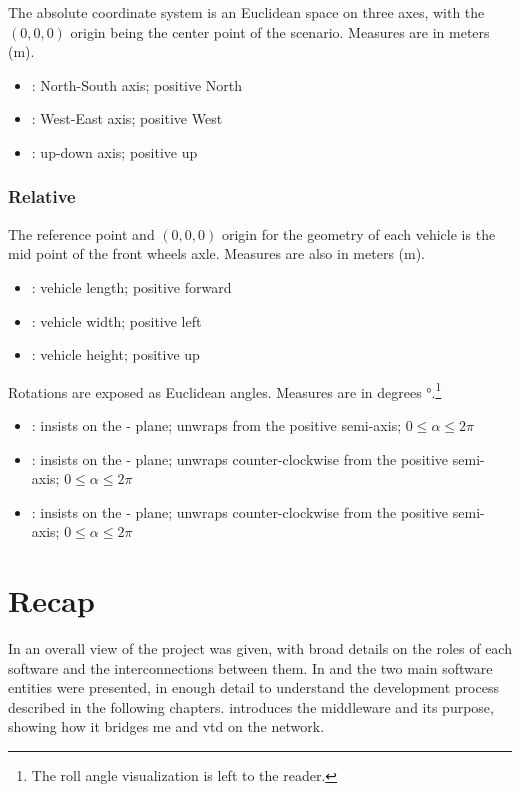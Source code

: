 The absolute coordinate system is an Euclidean space on three axes, with the $(0,0,0)$ origin being the center point of the scenario. Measures are in meters (\si{\meter}).

\begin{itemize}
	\item {}: North-South axis; positive North
	\item {}: West-East axis; positive West
	\item {}: up-down axis; positive up
\end{itemize}

\subsubsection{Relative}

The reference point and $(0,0,0)$ origin for the geometry of each vehicle is the mid point of the front wheels axle. Measures are also in meters (\si{\meter}).

\begin{itemize}
	\item {}: vehicle length; positive forward
	\item {}: vehicle width; positive left
	\item {}: vehicle height; positive up
\end{itemize}

Rotations are exposed as Euclidean angles. Measures are in degrees \si{\degree}.\footnote{The roll angle visualization is left to the reader.}

\begin{itemize}
	\item {}: insists on the - plane; unwraps from the positive  semi-axis; $0 \leqslant \alpha \leqslant 2\pi$
	\item {}: insists on the - plane; unwraps counter-clockwise from the positive  semi-axis; $0 \leqslant \alpha \leqslant 2\pi$
	\item {}: insists on the - plane; unwraps counter-clockwise from the positive  semi-axis; $0 \leqslant \alpha \leqslant 2\pi$
\end{itemize}

\section{Recap}\label{sc:software:recap}

In  an overall view of the project was given, with broad details on the roles of each software and the interconnections between them. In  and  the two main software entities were presented, in enough detail to understand the development process described in the following chapters.  introduces the \gls{middleware} and its purpose, showing how it bridges \gls{me} and \gls{vtd} on the network.
